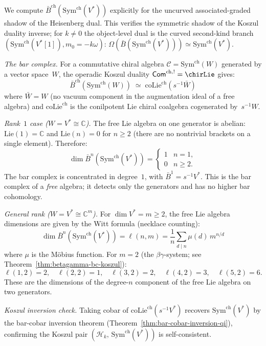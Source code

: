 \begin{computation}
\label{comp:bar-sym-ch}
We compute $\bar{B}^{\mathrm{ch}}(\mathrm{Sym}^{\mathrm{ch}}(V^*))$
explicitly for the uncurved associated-graded shadow of the
Heisenberg dual. This verifies the symmetric shadow of the Koszul
duality inverse; for $k\ne0$ the object-level dual is the curved
second-kind branch
$(\mathrm{Sym}^{\mathrm{ch}}(V^*[1]),m_0=-k\omega)$:
$\Omega(\bar{B}(\mathrm{Sym}^{\mathrm{ch}}(V^*)))
\simeq \mathrm{Sym}^{\mathrm{ch}}(V^*)$.

\emph{The bar complex.}
For a commutative chiral algebra $\mathcal{C} = \mathrm{Sym}^{\mathrm{ch}}(W)$
generated by a vector space~$W$, the operadic Koszul duality
$\mathsf{Com}^{\mathrm{ch},!} = \chirLie$ gives:
\[
\bar{B}^{\mathrm{ch}}(\mathrm{Sym}^{\mathrm{ch}}(W))
\;\simeq\;
\mathrm{coLie}^{\mathrm{ch}}(s^{-1}\bar{W})
\]
where $\bar{W} = W$ (no vacuum component in the augmentation ideal
of a free algebra) and $\mathrm{coLie}^{\mathrm{ch}}$ is the
conilpotent Lie chiral coalgebra cogenerated by~$s^{-1}W$.

\emph{Rank~$1$ case ($W = V^* \cong \mathbb{C}$).}
The free Lie algebra on one generator is abelian: $\mathrm{Lie}(1) = \mathbb{C}$
and $\mathrm{Lie}(n) = 0$ for $n \geq 2$
(there are no nontrivial brackets on a single element).
Therefore:
\begin{equation}\label{eq:bar-sym-rank1}
\dim \bar{B}^n(\mathrm{Sym}^{\mathrm{ch}}(V^*)) =
\begin{cases}
1 & n = 1, \\
0 & n \geq 2.
\end{cases}
\end{equation}
The bar complex is concentrated in degree~$1$, with
$\bar{B}^1 = s^{-1}V^*$. This is the bar complex of a
\emph{free} algebra; it detects only the generators and has
no higher bar cohomology.

\emph{General rank ($W = V^* \cong \mathbb{C}^m$).}
For $\dim V^* = m \geq 2$, the free Lie algebra dimensions
are given by the Witt formula (necklace counting):
\[
\dim \bar{B}^n(\mathrm{Sym}^{\mathrm{ch}}(V^*))
= \ell(n, m) = \frac{1}{n}\sum_{d \mid n} \mu(d)\, m^{n/d}
\]
where $\mu$ is the M\"obius function. For $m = 2$
(the $\beta\gamma$-system; see Theorem~\ref{thm:betagamma-bc-koszul}):
\[
\ell(1,2) = 2,\quad
\ell(2,2) = 1,\quad
\ell(3,2) = 2,\quad
\ell(4,2) = 3,\quad
\ell(5,2) = 6.
\]
These are the dimensions of the degree-$n$ component of the
free Lie algebra on two generators.

\emph{Koszul inversion check.}
Taking cobar of $\mathrm{coLie}^{\mathrm{ch}}(s^{-1}V^*)$
recovers $\mathrm{Sym}^{\mathrm{ch}}(V^*)$ by the
bar-cobar inversion theorem
(Theorem~\ref{thm:bar-cobar-inversion-qi}), confirming the
Koszul pair $(\mathcal{H}_k,\,
\mathrm{Sym}^{\mathrm{ch}}(V^*))$ is self-consistent.
\end{computation}

